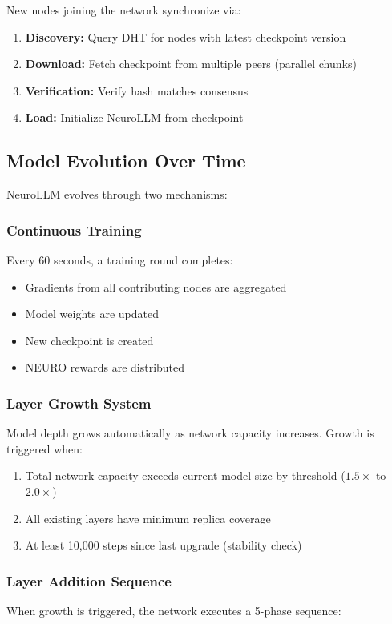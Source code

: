 \documentclass[11pt,a4paper]{article}
\begin{document}
New nodes joining the network synchronize via:

\begin{enumerate}
    \item \textbf{Discovery:} Query DHT for nodes with latest checkpoint version
    \item \textbf{Download:} Fetch checkpoint from multiple peers (parallel chunks)
    \item \textbf{Verification:} Verify hash matches consensus
    \item \textbf{Load:} Initialize NeuroLLM from checkpoint
\end{enumerate}

\subsection{Model Evolution Over Time}

NeuroLLM evolves through two mechanisms:

\subsubsection{Continuous Training}
Every 60 seconds, a training round completes:
\begin{itemize}
    \item Gradients from all contributing nodes are aggregated
    \item Model weights are updated
    \item New checkpoint is created
    \item NEURO rewards are distributed
\end{itemize}

\subsubsection{Layer Growth System}
Model depth grows automatically as network capacity increases. Growth is triggered when:
\begin{enumerate}
    \item Total network capacity exceeds current model size by threshold ($1.5\times$ to $2.0\times$)
    \item All existing layers have minimum replica coverage
    \item At least 10,000 steps since last upgrade (stability check)
\end{enumerate}

\subsubsection{Layer Addition Sequence}
When growth is triggered, the network executes a 5-phase sequence:
\end{document}
